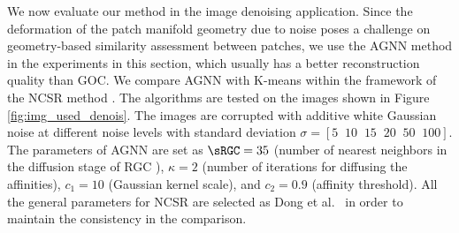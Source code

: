 \documentclass[journal]{IEEEtran}
\begin{document}
We now evaluate our method in the image denoising application. Since the deformation of the patch manifold geometry due to noise poses a challenge on geometry-based similarity assessment between patches, we use the AGNN method in the experiments in this section, which usually has a better reconstruction quality than GOC. We compare AGNN with K-means within the framework of the NCSR method \cite{Dong13nonlocally}. The algorithms are tested on the images shown in Figure \ref{fig:img_used_denois}. The images are corrupted with additive white Gaussian noise at different noise levels with standard deviation $\sigma = \left[5\;\; 10\;\; 15\;\; 20 \;\; 50\;\; 100\right]$. The parameters of AGNN are set as  $\sRGC=35$ (number of nearest neighbors in the diffusion stage of RGC \cite{Donoser13replicator}), $\kappa=2$ (number of iterations for diffusing the affinities),  $c_1=10$ (Gaussian kernel scale), and $c_2=0.9$ (affinity threshold). All the general parameters for NCSR are selected as Dong et al.~\cite{Dong13nonlocally} in order to maintain the consistency in the comparison.
\end{document}
